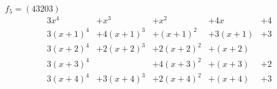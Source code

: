 \documentclass[a4paper, 12pt]{extarticle}
\begin{document}
$f_5 = (43203)$
$$\begin{array}{ccccc}
3x^4 & + x^3 & + x^2 & + 4x & + 4 \\
3(x + 1)^4 & + 4(x + 1)^3 & + (x + 1)^2 & + 3(x + 1) & + 3 \\
3(x + 2)^4 & + 2(x + 2)^3 & + 2(x + 2)^2 & + (x + 2) &  \\
3(x + 3)^4 &  & + 4(x + 3)^2 & + (x + 3) & + 2 \\
3(x + 4)^4 & + 3(x + 4)^3 & + 2(x + 4)^2 & + (x + 4) & + 3 \\
\end{array}$$
\end{document}

